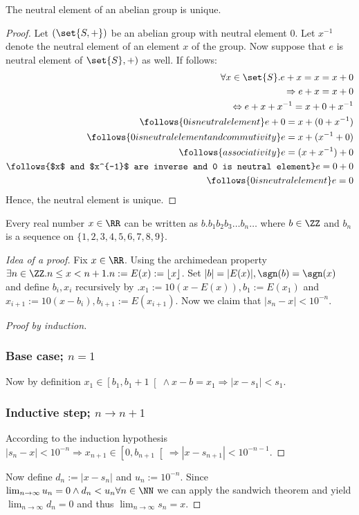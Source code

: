 \begin{lem}
	The neutral element of an abelian group is unique.
\end{lem}
\begin{proof}
	Let $(\set{S,+})$ be an abelian group with neutral element $0$. Let $x^{-1}$ denote the neutral element of an element $x$ of the group. Now suppose that $e$ is neutral element of  $\set{S},+)$ as well. If follows:
	\begin{align*}
	\forall x\in\set{S}.e+x=x=x+0\\
	\Rightarrow e+x=x+0\\
	\Leftrightarrow e+x+x^{-1}=x+0+x^{-1}\\
	\follows{0is neutral element} e+0=x+(0+x^{-1})\\
	\follows{0 is neutral element and commutivity} e=x+(x^{-1}+0)\\
	\follows{associativity} e=(x+x^{-1})+0\\
	\follows{$x$ and $x^{-1}$ are inverse and 0 is neutral element} e=0+0\\
	\follows{0is neutral element} e=0
	\end{align*}
	Hence, the neutral element is unique.
\end{proof}
\begin{thm}
	Every real number $x\in\RR$ can be written as $b.b_1b_2b_3\ldots b_n\ldots$ where $b\in\ZZ$ and $b_n$ is a sequence on $\{1,2,3,4,5,6,7,8,9\}$. 
\end{thm}
\begin{proof}[Idea of a proof]
	Fix $x\in\RR$. Using the archimedean property $\exists n\in\ZZ.n\leq x<n+1.n:=E(x):=\lfloor x\rfloor$.
	Set $|b|=|E(x)|, \sgn(b)=\sgn(x)$ and define $b_i, x_i$ recursively by $.x_1:=10(x-E(x)), b_1:=E(x_1)$ and $x_{i+1}:=10(x-b_i), b_{i+1}:=E(x_{i+1})$.
	Now we claim that $|s_n-x|<10^{-n}$. \begin{proof}[Proof by induction]
		\subsubsection*{Base case; $n=1$}
		Now by definition $x_1\in\left[b_1,b_1+1\right[\land x-b=x_1\Rightarrow |x-s_1|<s_1$.
		\subsubsection*{Inductive step; $n\to n+1$}
		According to the induction hypothesis $|s_n-x|<10^{-n}\Rightarrow x_{n+1}\in\left[0,b_{n+1}\right[\Rightarrow |x-s_{n+1}|<10^{-n-1}$.
	\end{proof}
	Now define $d_n:=|x-s_n|$ and $u_n:=10^{-n}$. Since $\lim_{n\to\infty}u_n=0 \land d_n<u_n\forall n\in\NN$ we can apply the sandwich theorem and yield $\lim_{n\to\infty}d_n=0$ and thus $\lim_{n\to\infty} s_n=x$.
\end{proof}